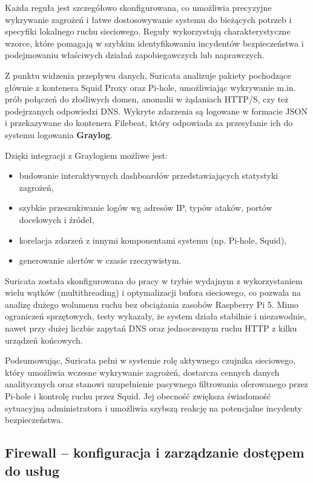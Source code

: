\documentclass[
    left=2.5cm,         %
    right=2.5cm,        %
    top=2.5cm,          %
    bottom=3cm,         %
    bindingoffset=6mm,  %
    nohyphenation=true %
]{eiti/eiti-thesis} %
\begin{document}
Każda reguła jest szczegółowo skonfigurowana, co umożliwia precyzyjne wykrywanie zagrożeń i łatwe dostosowywanie systemu do bieżących potrzeb i specyfiki lokalnego ruchu sieciowego. Reguły wykorzystują charakterystyczne wzorce, które pomagają w szybkim identyfikowaniu incydentów bezpieczeństwa i podejmowaniu właściwych działań zapobiegawczych lub naprawczych. 

Z punktu widzenia przepływu danych, Suricata analizuje pakiety pochodzące głównie z kontenera Squid Proxy oraz Pi-hole, umożliwiając wykrywanie m.in. prób połączeń do złośliwych domen, anomalii w żądaniach HTTP/S, czy też podejrzanych odpowiedzi DNS. Wykryte zdarzenia są logowane w formacie JSON i przekazywane do kontenera Filebeat, który odpowiada za przesyłanie ich do systemu logowania \textbf{Graylog}.

Dzięki integracji z Graylogiem możliwe jest:
\begin{itemize}
    \item budowanie interaktywnych dashboardów przedstawiających statystyki zagrożeń,
    \item szybkie przeszukiwanie logów wg adresów IP, typów ataków, portów docelowych i źródeł,
    \item korelacja zdarzeń z innymi komponentami systemu (np. Pi-hole, Squid),
    \item generowanie alertów w czasie rzeczywistym.
\end{itemize}

Suricata została skonfigurowana do pracy w trybie wydajnym z wykorzystaniem wielu wątków (multithreading) i optymalizacji bufora sieciowego, co pozwala na analizę dużego wolumenu ruchu bez obciążania zasobów Raspberry Pi 5. Mimo ograniczeń sprzętowych, testy wykazały, że system działa stabilnie i niezawodnie, nawet przy dużej liczbie zapytań DNS oraz jednoczesnym ruchu HTTP z kilku urządzeń końcowych.

Podsumowując, Suricata pełni w systemie rolę aktywnego czujnika sieciowego, który umożliwia wczesne wykrywanie zagrożeń, dostarcza cennych danych analitycznych oraz stanowi uzupełnienie pasywnego filtrowania oferowanego przez Pi-hole i kontrolę ruchu przez Squid. Jej obecność zwiększa świadomość sytuacyjną administratora i umożliwia szybszą reakcję na potencjalne incydenty bezpieczeństwa.

\subsection{Firewall – konfiguracja i zarządzanie dostępem do usług}
\end{document}
